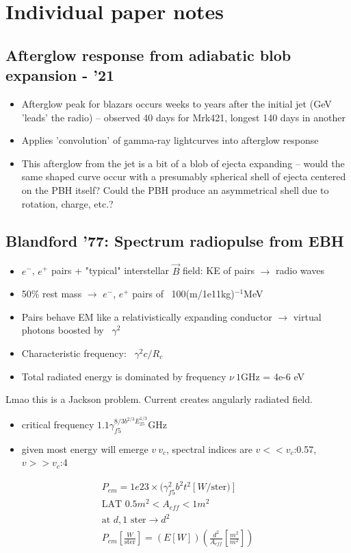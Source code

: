 \documentclass[12pt]{article}
\newenvironment{tightemize}{\vspace{-\topsep}\begin{itemize}\itemsep1pt \parskip0pt \parsep0pt}{\end{itemize}\vspace{-\topsep}}
\begin{document}
\tableofcontents

\section{Individual paper notes}

\subsection{Afterglow response from adiabatic blob expansion - '21}
\begin{tightemize}
    \item Afterglow peak for blazars occurs weeks to years after the initial jet (GeV 'leads' the radio) -- observed 40 days for Mrk421, longest 140 days in another
    \item Applies 'convolution' of gamma-ray lightcurves into afterglow response
    \item This afterglow from the jet is a bit of a blob of ejecta expanding -- would the same shaped curve occur with a presumably spherical shell of ejecta centered on the PBH itself? Could the PBH produce an asymmetrical shell due to rotation, charge, etc.?
\end{tightemize}

\subsection{Blandford '77: Spectrum radiopulse from EBH}
\begin{tightemize}
    \item $e^-$, $e^+$ pairs + "typical" interstellar $\vec{B}$ field: KE of pairs $\to$ radio waves
    \item 50\% rest mass $\to$ $e^-$, $e^+$ pairs of ~100(m/1e11kg)$^{-1}$MeV
    \item Pairs behave EM like a relativistically expanding conductor $\to$ virtual photons boosted by ~$\gamma^2$
    \item Characteristic frequency: ~$\gamma^2 c/R_c$
    \item Total radiated energy is dominated by frequency $\nu ~ 1$GHz = 4e-6 eV
\end{tightemize}
Lmao this is a Jackson problem. Current creates angularly radiated field.
\begin{tightemize}
    \item critical frequency $1.1\gamma_{f5}^{{8/3}b^{2/3}E_{25}^{1/3}}$GHz
    \item given most energy will emerge $v~v_c$, spectral indices are $v<<v_c$:0.57, $v>>v_c$:4
\end{tightemize}
\begin{equation}
\begin{gathered}
P_{em} = 1e23 \times (\gamma_{f5}^2 b^2t^2 [W/\mbox{ster})]\\
\mbox{LAT } 0.5m^2 < A_{eff} < 1m^2\\
\mbox{at }d, \mbox{1 ster} \to d^2\\
P_{em}[\frac{W}{\mbox{ster}}] = (E [W])(\frac{d^2}{A_{eff}}[\frac{m^2}{m^2}])
\end{gathered}
\end{equation}
\end{document}
